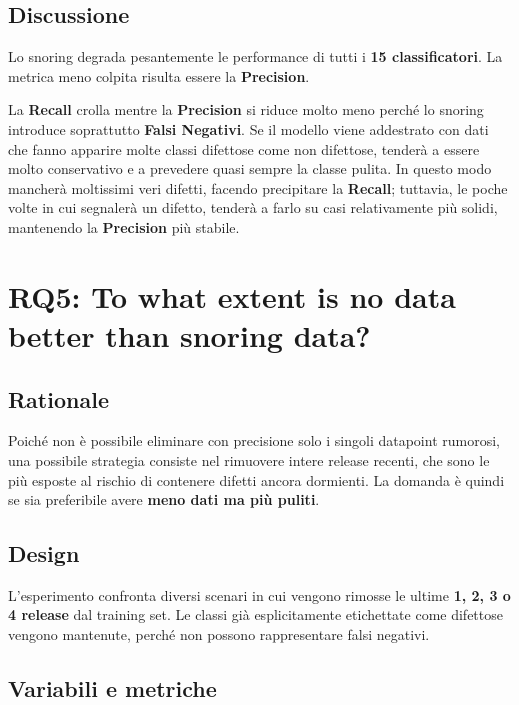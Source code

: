 \subsection{Discussione}

Lo snoring degrada pesantemente le performance di tutti i \textbf{15 classificatori}. La metrica meno colpita risulta essere la \textbf{Precision}.

\begin{notaesame}
La \textbf{Recall} crolla mentre la \textbf{Precision} si riduce molto meno perché lo snoring introduce soprattutto \textbf{Falsi Negativi}. Se il modello viene addestrato con dati che fanno apparire molte classi difettose come non difettose, tenderà a essere molto conservativo e a prevedere quasi sempre la classe pulita. In questo modo mancherà moltissimi veri difetti, facendo precipitare la \textbf{Recall}; tuttavia, le poche volte in cui segnalerà un difetto, tenderà a farlo su casi relativamente più solidi, mantenendo la \textbf{Precision} più stabile.
\end{notaesame}

\section{RQ5: To what extent is no data better than snoring data?}

\subsection{Rationale}

Poiché non è possibile eliminare con precisione solo i singoli datapoint rumorosi, una possibile strategia consiste nel rimuovere intere release recenti, che sono le più esposte al rischio di contenere difetti ancora dormienti. La domanda è quindi se sia preferibile avere \textbf{meno dati ma più puliti}.

\subsection{Design}

L'esperimento confronta diversi scenari in cui vengono rimosse le ultime \textbf{1, 2, 3 o 4 release} dal training set. Le classi già esplicitamente etichettate come difettose vengono mantenute, perché non possono rappresentare falsi negativi.

\subsection{Variabili e metriche}


